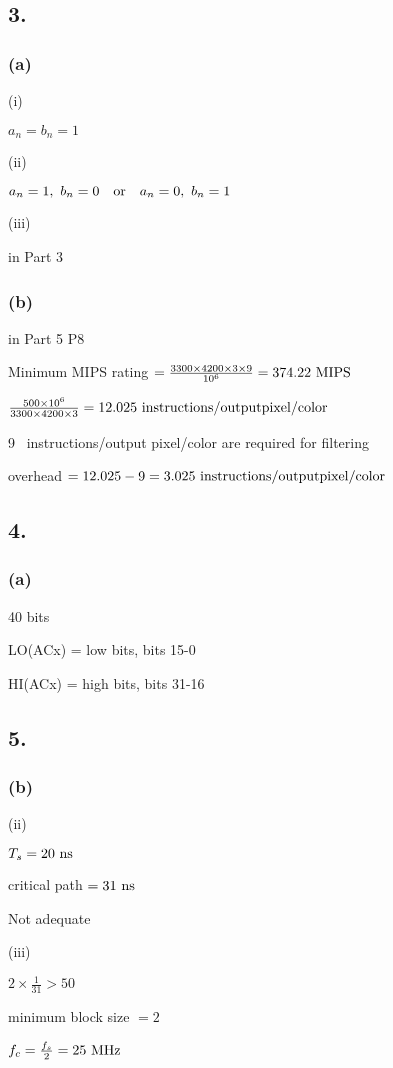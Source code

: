 \documentclass{article}
\begin{document}
\subsection*{3.}
\subsubsection*{(a)}
(i)\par
$a_{n}=b_{n}=1$\par\indent
\par
(ii)\par
$a_{n}=1, \ b_{n}=0 \quad {\rm or} \quad a_{n}=0, \ b_{n}=1$\par\indent
\par
(iii)\par
in Part 3

\subsubsection*{(b)}
in Part 5 P8\par
Minimum MIPS rating $=\frac{3300 \times 4200 \times 3 \times 9}{10^{6}}=374.22 \ {\rm MIPS}$\par
$\frac{500 \times 10^{6}}{3300 \times 4200 \times 3}=12.025 \ {\rm instructions/output pixel/color}$\par
9 \ instructions/output pixel/color are required for filtering\par
overhead $=12.025-9=3.025 \ {\rm instructions/output pixel/color}$

\subsection*{4.}
\subsubsection*{(a)}
40 bits\par
LO(ACx) = low bits, bits 15-0\par
HI(ACx) = high bits, bits 31-16\par



\subsection*{5.}
\subsubsection*{(b)}
(ii)\par
$T_{s}=20 \ {\rm ns}$\par
critical path $=31 \ {\rm ns}$\par
Not adequate\par\indent
\par
(iii)\par
$2 \times \frac{1}{31} > 50$\par
minimum block size $=2$\par
$f_{c}=\frac{f_{s}}{2}=25 \ {\rm MHz}$
\clearpage
\end{document}
